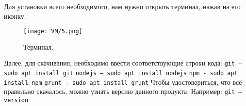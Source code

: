 Для установки всего необходимого, нам нужно открыть терминал, нажав на его иконку. 

\begin{figure}[h]
		\centering
		\texttt{[image: VM/5.png]}
\caption{Терминал.}
\label{ris:image}
\end{figure}

Далее, для скачивания, необходимо ввести соответствующие строки кода:
\newline \texttt{git – sudo apt install git}
\newline \texttt{nodejs – sudo apt install nodejs}
\newline \texttt{npm - sudo apt install npm}
\newline \texttt{grunt - sudo apt install grunt}
\newline Чтобы удостовериться, что всё правильно скачалось, можно узнать версию данного продукта. Например: \texttt{git –version}